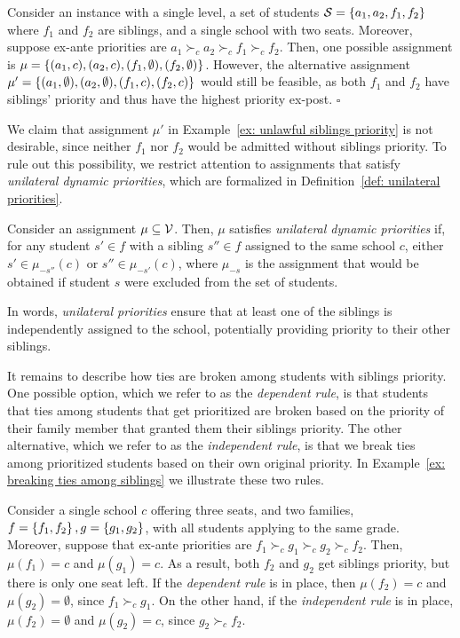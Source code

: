     \begin{example}\label{ex: unlawful siblings priority}
      Consider an instance with a single level, a set of students \(\mathcal{S} = \left\{a_1, a_2, f_1, f_2\right\}\) where \(f_1\) and \(f_2\) are siblings, and a single school with two seats. Moreover, suppose ex-ante priorities are \(a_1 \succ_c a_2 \succ_c f_1 \succ_c f_2\). Then, one possible assignment is \(\mu = \left\{(a_1, c), (a_2, c), (f_1, \emptyset), (f_2, \emptyset)\right\}\). However, the alternative assignment \(\mu' = \left\{(a_1, \emptyset), (a_2, \emptyset), (f_1, c), (f_2,c)\right\}\) would still be feasible, as both \(f_1\) and \(f_2\) have siblings' priority and thus have the highest priority ex-post. \hfill \(\square\)
    \end{example}

    We claim that assignment \(\mu'\) in Example~\ref{ex: unlawful siblings priority} is not desirable, since neither \(f_1\) nor \(f_2\) would be admitted without siblings priority. To rule out this possibility, we restrict attention to assignments that satisfy \emph{unilateral dynamic priorities}, which are formalized in Definition~\ref{def: unilateral priorities}.
    \begin{definition}\label{def: unilateral priorities}
      Consider an assignment \(\mu \subseteq \mathcal{V}\). Then, \(\mu\) satisfies \emph{unilateral dynamic priorities} if, for any student \(s'\in f\) with a sibling \(s''\in f\) assigned to the same school \(c\), either \(s'\in\mu_{-s''}(c)\) or \(s''\in \mu_{-s'}(c)\), where \(\mu_{-s}\) is the assignment that would be obtained if student \(s\) were excluded from the set of students.
    \end{definition}
    In words, \emph{unilateral priorities} ensure that at least one of the siblings is independently assigned to the school, potentially providing priority to their other siblings.

    It remains to describe how ties are broken among students with siblings priority. One possible option, which we refer to as the \emph{dependent rule}, is that students that ties among students that get prioritized are broken based on the priority of their family member that granted them their siblings priority. The other alternative, which we refer to as the \emph{independent rule}, is that we break ties among prioritized students based on their own original priority. In Example~\ref{ex: breaking ties among siblings} we illustrate these two rules.

    \begin{example}\label{ex: breaking ties among siblings}
      Consider a single school \(c\) offering three seats, and two families, \(f = \left\{f_1, f_2\right\}, g=\left\{g_1,g_2\right\}\), with all students applying to the same grade. Moreover, suppose that ex-ante priorities are \(f_1 \succ_c g_1 \succ_c g_2 \succ_c f_2\). Then, \(\mu(f_1)=c\) and \(\mu(g_1)=c\). As a result, both \(f_2\) and \(g_2\) get siblings priority, but there is only one seat left. If the \emph{dependent rule} is in place, then \(\mu(f_2) = c\) and \(\mu(g_2) = \emptyset\), since \(f_1 \succ_c g_1\). On the other hand, if the \emph{independent rule} is in place, \(\mu(f_2) = \emptyset\) and \(\mu(g_2) = c\), since \(g_2 \succ_c f_2\).
    \end{example}

